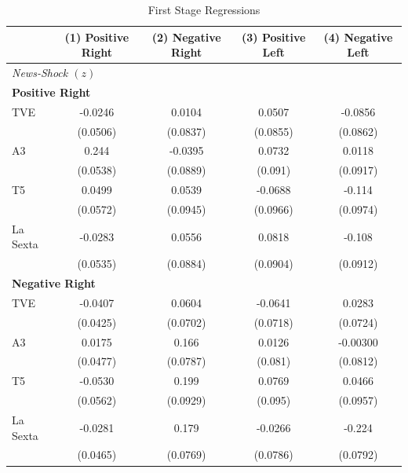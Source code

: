 \documentclass[12pt]{article}
\begin{document}
\begin{table}[htbp]
\centering
\scriptsize
\setlength{\tabcolsep}{4pt}
\renewcommand{\arraystretch}{0.9}
\caption{First Stage Regressions}
\label{tab:first_stage}
\begin{tabular}{lcccc}
	\hline
	\multicolumn{1}{c}{} & \textbf{(1) Positive Right} & \textbf{(2) Negative Right} & \textbf{(3) Positive Left} & \textbf{(4) Negative Left} \\
	\hline
	
	\multicolumn{5}{l}{\textit{News‐Shock $(z)$}}\\
	\hline
	
	\multicolumn{5}{l}{\textbf{Positive Right}}\\
	\hline
	TVE       & -0.0246       & 0.0104        & 0.0507        & -0.0856       \\
	& (0.0506)      & (0.0837)      & (0.0855)      & (0.0862)      \\
	A3        & 0.244\sym{***}& -0.0395       & 0.0732        & 0.0118        \\
	& (0.0538)      & (0.0889)      & (0.091)       & (0.0917)      \\
	T5        & 0.0499        & 0.0539        & -0.0688       & -0.114        \\
	& (0.0572)      & (0.0945)      & (0.0966)      & (0.0974)      \\
	La Sexta  & -0.0283       & 0.0556        & 0.0818        & -0.108        \\
	& (0.0535)      & (0.0884)      & (0.0904)      & (0.0912)      \\
	\hline
	
	\multicolumn{5}{l}{\textbf{Negative Right}}\\
	\hline
	TVE       & -0.0407       & 0.0604        & -0.0641       & 0.0283        \\
	& (0.0425)      & (0.0702)      & (0.0718)      & (0.0724)      \\
	A3        & 0.0175        & 0.166\sym{*}  & 0.0126        & -0.00300      \\
	& (0.0477)      & (0.0787)      & (0.081)       & (0.0812)      \\
	T5        & -0.0530       & 0.199\sym{*}  & 0.0769        & 0.0466        \\
	& (0.0562)      & (0.0929)      & (0.095)       & (0.0957)      \\
	La Sexta  & -0.0281       & 0.179\sym{**} & -0.0266       & -0.224\sym{**}\\
	& (0.0465)      & (0.0769)      & (0.0786)      & (0.0792)      \\
	\hline
	

\end{tabular}
\end{table}
\end{document}
